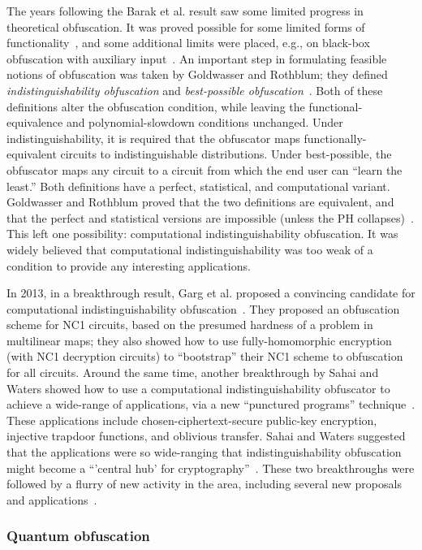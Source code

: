 \documentclass[envcountsame]{llncs}
\numberwithin{equation}{section}
\begin{document}
The years following the Barak et al. result saw some limited progress in theoretical obfuscation. It was proved possible for some limited forms of functionality~\cite{CD08, Wee05}, and some additional limits were placed, e.g., on black-box obfuscation with auxiliary input~\cite{GK05}. An important step in formulating feasible notions of obfuscation was taken by Goldwasser and Rothblum; they defined \emph{indistinguishability obfuscation} and \emph{best-possible obfuscation}~\cite{GR07}. Both of these definitions alter the obfuscation condition, while leaving the functional-equivalence and polynomial-slowdown conditions unchanged. Under indistinguishability, it is required that the obfuscator maps functionally-equivalent circuits to indistinguishable distributions. Under best-possible, the obfuscator maps any circuit to a circuit from which the end user can ``learn the least.'' Both definitions have a perfect, statistical, and computational variant. Goldwasser and Rothblum proved that the two definitions are equivalent, and that the perfect and statistical versions are impossible (unless the PH collapses)~\cite{GR07}. This left one possibility: computational indistinguishability obfuscation. It was widely believed that computational indistinguishability was too weak of a condition to provide any interesting applications.

In 2013, in a breakthrough result, Garg et al. proposed a convincing candidate for computational indistinguishability obfuscation~\cite{GGHRSW13}. They proposed an obfuscation scheme for NC1 circuits, based on the presumed hardness of a problem in multilinear maps; they also showed how to use fully-homomorphic encryption (with NC1 decryption circuits) to ``bootstrap'' their NC1 scheme to obfuscation for all circuits. Around the same time, another breakthrough by Sahai and Waters showed how to use a computational indistinguishability obfuscator to achieve a wide-range of applications, via a new ``punctured programs'' technique~\cite{SW14}. These applications include chosen-ciphertext-secure public-key encryption, injective trapdoor functions, and oblivious transfer. Sahai and Waters suggested that the applications were so wide-ranging that indistinguishability obfuscation might become a ``'central hub' for cryptography''~\cite{SW14}. These two breakthroughs were followed by a flurry of new activity in the area, including several new proposals and applications~\cite{BGKPS14, BCCGKPR14, BZ14, BR14, GGHW14, HSW14}.

\subsubsection{Quantum obfuscation} 
\end{document}
